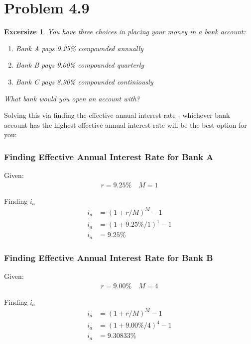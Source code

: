 \documentclass[../INDE250HW.tex]{subfiles}
\newtheorem{exrc}{Excersize}
\begin{document}
\section*{Problem 4.9}
\begin{exrc}
    You have three choices in placing your money in a bank account:
    \begin{enumerate}
        \item Bank A pays 9.25\% compounded annually
        \item Bank B pays 9.00\% compounded quarterly
        \item Bank C pays 8.90\% compounded continiously
    \end{enumerate}
    What bank would you open an account with?
\end{exrc}
Solving this via finding the effective annual interest rate - whichever bank account has the highest effective annual interest rate will be the best option for you:
\subsubsection*{Finding Effective Annual Interest Rate for Bank A}
Given:
\begin{equation*}
    \begin{aligned}
        r = 9.25\% \quad M = 1
    \end{aligned}
\end{equation*}

\noindent
Finding $i_a$
\begin{equation*}
    \begin{aligned}
        i_a &= (1 + r/M)^M - 1 \\
        i_a &= (1 + 9.25\%/1)^1 - 1 \\
        i_a &= 9.25\%
    \end{aligned}
\end{equation*}

\subsubsection*{Finding Effective Annual Interest Rate for Bank B}
Given:
\begin{equation*}
    \begin{aligned}
        r = 9.00\% \quad M = 4
    \end{aligned}
\end{equation*}

\noindent
Finding $i_a$
\begin{equation*}
    \begin{aligned}
        i_a &= (1 + r/M)^M - 1 \\
        i_a &= (1 + 9.00\%/4)^4 - 1 \\
        i_a &= 9.30833\%
    \end{aligned}
\end{equation*}
\end{document}
